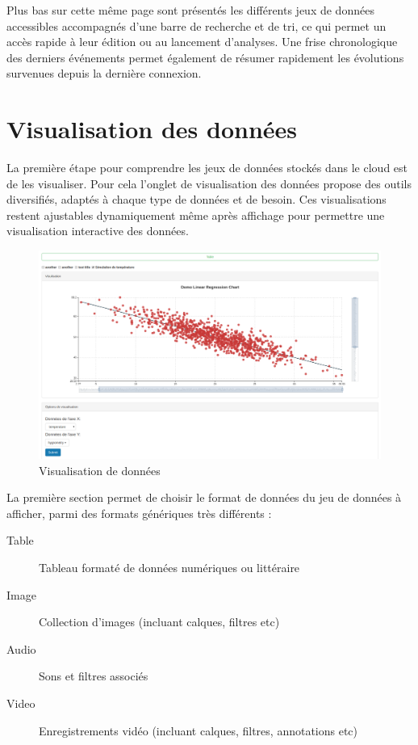 \documentclass[a4paper]{report}
\begin{document}
Plus bas sur cette même page sont présentés les différents jeux de données accessibles accompagnés d'une barre de recherche et de tri, ce qui permet un accès rapide à leur édition ou au lancement d'analyses. Une frise chronologique des derniers événements permet également de résumer rapidement les évolutions survenues depuis la dernière connexion.




\newpage
\section{Visualisation des données}
\label{sec:graphics}

La première étape pour comprendre les jeux de données stockés dans le cloud est de les visualiser. Pour cela l'onglet de visualisation des données propose des outils diversifiés, adaptés à chaque type de données et de besoin. Ces visualisations restent ajustables dynamiquement même après affichage pour permettre une visualisation interactive des données.

\begin{figure}[h]
	\includegraphics[width=\textwidth]{images/graphics.png}
	\caption{\label{fig:graphics} Visualisation de données}
\end{figure}

La première section permet de choisir le format de données du jeu de données à afficher, parmi des formats génériques très différents :

\begin{description}
	\item[Table] Tableau formaté de données numériques ou littéraire
	\item[Image] Collection d'images (incluant calques, filtres etc)
	\item[Audio] Sons et filtres associés
	\item[Video] Enregistrements vidéo (incluant calques, filtres, annotations etc)
\end{description}
\end{document}
